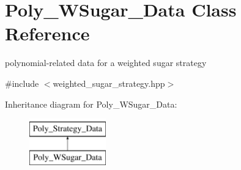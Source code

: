 \hypertarget{class_poly___w_sugar___data}{}\section{Poly\+\_\+\+W\+Sugar\+\_\+\+Data Class Reference}
\label{class_poly___w_sugar___data}


polynomial-\/related data for a weighted sugar strategy  




{\ttfamily \#include $<$weighted\+\_\+sugar\+\_\+strategy.\+hpp$>$}

Inheritance diagram for Poly\+\_\+\+W\+Sugar\+\_\+\+Data\+:\begin{figure}[H]
\begin{center}
\leavevmode
\includegraphics[height=2.000000cm]{class_poly___w_sugar___data}
\end{center}
\end{figure}
